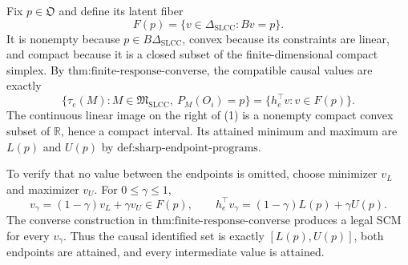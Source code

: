 Fix \(p\in\mathfrak O\) and define its latent fiber
\[
F(p)=\{v\in\Delta_{\mathrm{SLCC}}:Bv=p\}.
\]
It is nonempty because \(p\in B\Delta_{\mathrm{SLCC}}\), convex because its constraints are linear, and compact because it is a closed subset of the finite-dimensional compact simplex.  By \(\text{thm:finite-response-converse}\), the compatible causal values are exactly
\[
\{\tau_e(M):M\in\mathfrak M_{\mathrm{SLCC}},\ P_M(O_i)=p\}
=\{h_e^{\top}v:v\in F(p)\}.
\tag{1}
\]
The continuous linear image on the right of (1) is a nonempty compact convex subset of \(\mathbb R\), hence a compact interval.  Its attained minimum and maximum are \(L(p)\) and \(U(p)\) by \(\text{def:sharp-endpoint-programs}\).

To verify that no value between the endpoints is omitted, choose minimizer \(v_L\) and maximizer \(v_U\).  For \(0\leq\gamma\leq1\),
\[
v_\gamma=(1-\gamma)v_L+\gamma v_U\in F(p),
\qquad
h_e^{\top}v_\gamma=(1-\gamma)L(p)+\gamma U(p).
\]
The converse construction in \(\text{thm:finite-response-converse}\) produces a legal SCM for every \(v_\gamma\).  Thus the causal identified set is exactly \([L(p),U(p)]\), both endpoints are attained, and every intermediate value is attained.